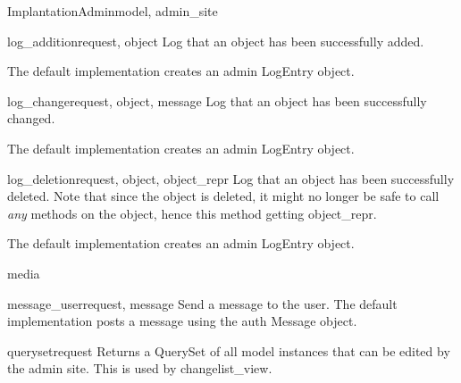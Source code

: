 \documentclass[letterpaper,10pt,english]{sphinxmanual}
\begin{document}
\begin{classdesc}{ImplantationAdmin}{model, admin\_site}
\hypertarget{data.admin.ImplantationAdmin.log_addition}{}\begin{methoddesc}{log\_addition}{request, object}
Log that an object has been successfully added.

The default implementation creates an admin LogEntry object.
\end{methoddesc}

\hypertarget{data.admin.ImplantationAdmin.log_change}{}\begin{methoddesc}{log\_change}{request, object, message}
Log that an object has been successfully changed.

The default implementation creates an admin LogEntry object.
\end{methoddesc}

\hypertarget{data.admin.ImplantationAdmin.log_deletion}{}\begin{methoddesc}{log\_deletion}{request, object, object\_repr}
Log that an object has been successfully deleted. Note that since the
object is deleted, it might no longer be safe to call \emph{any} methods
on the object, hence this method getting object\_repr.

The default implementation creates an admin LogEntry object.
\end{methoddesc}

\hypertarget{data.admin.ImplantationAdmin.media}{}\begin{memberdesc}{media}\end{memberdesc}

\hypertarget{data.admin.ImplantationAdmin.message_user}{}\begin{methoddesc}{message\_user}{request, message}
Send a message to the user. The default implementation
posts a message using the auth Message object.
\end{methoddesc}

\hypertarget{data.admin.ImplantationAdmin.queryset}{}\begin{methoddesc}{queryset}{request}
Returns a QuerySet of all model instances that can be edited by the
admin site. This is used by changelist\_view.
\end{methoddesc}


\end{classdesc}
\end{document}
